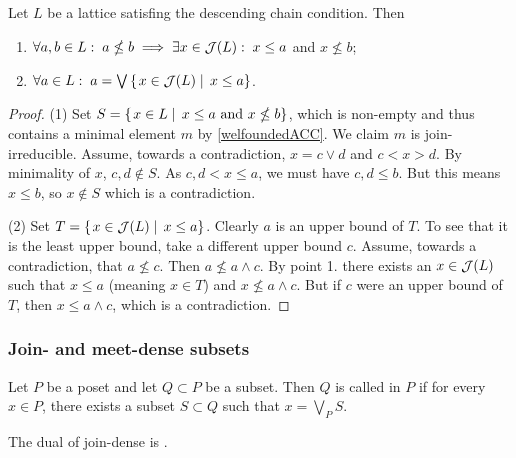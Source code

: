 \begin{proposition} \label{joinIrreducibilityDescendingChainLattice}
Let $L$ be a lattice satisfing the descending chain condition. Then
\begin{enumerate}
\item $\forall a,b\in L:\; a\nleq b \implies \exists x\in \mathop{\mathcal{J}}(L): \; x\leq a$ and $x\nleq b$;
\item $\forall a\in L:\; a = \bigvee\left\{\left. x\in\mathop{\mathcal{J}}(L) \;\right|\; x\leq a \right\}$.
\end{enumerate}
\end{proposition}
\begin{proof}
(1) Set $S = \left\{\left. x\in L \;\right|\; \text{$x\leq a$ and $x\nleq b$} \right\}$, which is non-empty and thus contains a minimal element $m$ by \ref{welfoundedACC}. We claim $m$ is join-irreducible. Assume, towards a contradiction, $x = c\vee d$ and $c < x > d$. By minimality of $x$, $c,d\notin S$. As $c,d< x \leq a$, we must have $c,d\leq b$. But this means $x\leq b$, so $x\notin S$ which is a contradiction.

(2) Set $T = \left\{\left. x\in\mathop{\mathcal{J}}(L) \;\right|\; x\leq a \right\}$. Clearly $a$ is an upper bound of $T$. To see that it is the least upper bound, take a different upper bound $c$. Assume, towards a contradiction, that $a\nleq c$. Then $a\nleq a\wedge c$. By point 1. there exists an $x\in\mathop{\mathcal{J}}(L)$ such that $x\leq a$ (meaning $x\in T$) and $x\nleq a\wedge c$. But if $c$ were an upper bound of $T$, then $x\leq a\wedge c$, which is a contradiction.
\end{proof}


\subsubsection{Join- and meet-dense subsets}
\begin{definition}
Let $P$ be a poset and let $Q\subset P$ be a subset. Then $Q$ is called  in $P$ if for every $x\in P$, there exists a subset $S\subset Q$ such that $x= \bigvee_P S$.

The dual of join-dense is .
\end{definition}

